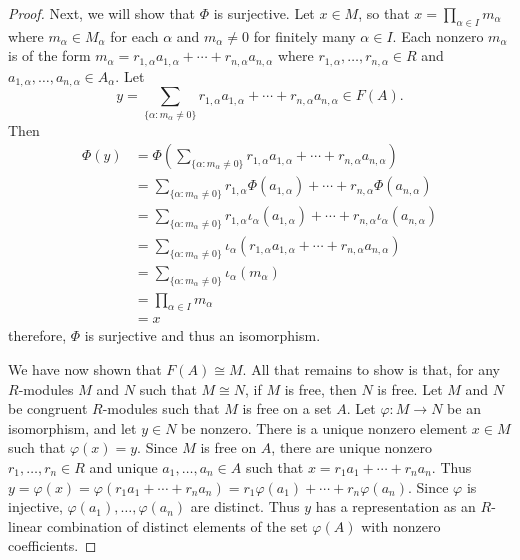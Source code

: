 \documentclass[10pt]{article}
\begin{document}
\begin{enumerate}
\begin{proof}
Next, we will show that $\Phi$ is surjective.  Let $x \in M$, so that $x = \prod_{\alpha \in I}m_\alpha$ where $m_\alpha \in M_\alpha$ for each $\alpha$ and $m_\alpha \neq 0$ for finitely many $\alpha \in I$.  Each nonzero $m_\alpha$ is of the form $m_\alpha = r_{1,\alpha}a_{1,\alpha} + \cdots + r_{n,\alpha}a_{n,\alpha}$ where $r_{1,\alpha}, \dots , r_{n,\alpha} \in R$ and $a_{1,\alpha}, \dots , a_{n,\alpha} \in A_\alpha$.  Let
$$
y = \sum_{\{\alpha: m_\alpha \neq 0\}} r_{1,\alpha}a_{1,\alpha} + \cdots + r_{n,\alpha}a_{n,\alpha} \in F(A).
$$
Then
\begin{align*}
\Phi(y) &= \Phi \left( \sum_{\{\alpha: m_\alpha \neq 0\}} r_{1,\alpha}a_{1,\alpha} + \cdots + r_{n,\alpha}a_{n,\alpha} \right)
\\
&= \sum_{\{\alpha: m_\alpha \neq 0\}} r_{1,\alpha} \Phi(a_{1,\alpha}) + \cdots + r_{n,\alpha} \Phi(a_{n,\alpha})
\\
&= \sum_{\{\alpha: m_\alpha \neq 0\}} r_{1,\alpha} \iota_\alpha(a_{1,\alpha}) + \cdots + r_{n,\alpha} \iota_\alpha(a_{n,\alpha})
\\
&= \sum_{\{\alpha: m_\alpha \neq 0\}} \iota_\alpha(r_{1,\alpha} a_{1,\alpha} + \cdots + r_{n,\alpha} a_{n,\alpha})
\\
&= \sum_{\{\alpha: m_\alpha \neq 0\}} \iota_\alpha(m_\alpha)
\\
&= \prod_{\alpha \in I} m_\alpha
\\
&= x
\end{align*}
therefore, $\Phi$ is surjective and thus an isomorphism.

We have now shown that $F(A) \cong M$.  All that remains to show is that, for any $R$-modules $M$ and $N$ such that $M \cong N$, if $M$ is free, then $N$ is free.  Let $M$ and $N$ be congruent $R$-modules such that $M$ is free on a set $A$.  Let $\varphi: M \rightarrow N$ be an isomorphism, and let $y \in N$ be nonzero.  There is a unique nonzero element $x \in M$ such that $\varphi(x) = y$.  Since $M$ is free on $A$, there are unique nonzero $r_1, \dots, r_n \in R$ and unique $a_1, \dots , a_n \in A$ such that $x = r_1a_1 + \cdots + r_na_n$.  Thus $y = \varphi(x) = \varphi(r_1a_1 + \cdots + r_na_n) = r_1\varphi(a_1) + \cdots + r_n\varphi(a_n)$.  Since $\varphi$ is injective, $\varphi(a_1),\dots , \varphi(a_n)$ are distinct.  Thus $y$ has a representation as an $R$-linear combination of distinct elements of the set $\varphi(A)$ with nonzero coefficients.


\end{proof}
\end{enumerate}
\end{document}
